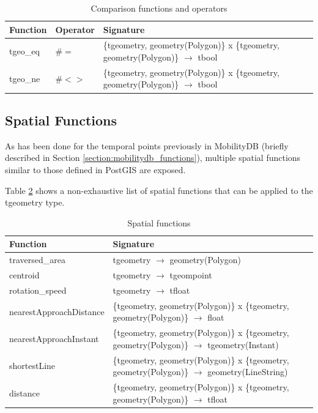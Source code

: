 \begin{table}[h!]
    \centering
    \begin{tabularx}{\textwidth}{|l|l|X|}
    \hline
    \textbf{Function}   & \textbf{Operator} & \textbf{Signature} \\
    \hline
    tgeo\_eq    & $\#=$   & \{tgeometry, geometry(Polygon)\} x \{tgeometry, geometry(Polygon)\} $\rightarrow$ tbool \\
    \hline
    tgeo\_ne    & $\#<>$  & \{tgeometry, geometry(Polygon)\} x \{tgeometry, geometry(Polygon)\} $\rightarrow$ tbool \\
    \hline
    \end{tabularx}
    \caption{Comparison functions and operators}
    \label{table:comparison_funcs}
\end{table}

\subsection{Spatial Functions}
\label{section:spatial_funcs}

As has been done for the temporal points previously in MobilityDB (briefly described in Section \ref{section:mobilitydb_functions}), multiple spatial functions similar to those defined in PostGIS are exposed. 

Table \ref{table:spatial_funcs} shows a non-exhaustive list of spatial functions that can be applied to the tgeometry type.

\begin{table}[h!]
    \centering
    \begin{tabularx}{\textwidth}{|l|X|}
    \hline
    \textbf{Function}   & \textbf{Signature} \\ 
    \hline
    traversed\_area      & tgeometry $\rightarrow$ geometry(Polygon)\\
    \hline
    centroid            & tgeometry $\rightarrow$ tgeompoint\\
    \hline
    rotation\_speed      & tgeometry $\rightarrow$ tfloat \\
    \hline
    nearestApproachDistance & \{tgeometry, geometry(Polygon)\} x \{tgeometry, geometry(Polygon)\} $\rightarrow$ float \\
    \hline
    nearestApproachInstant  & \{tgeometry, geometry(Polygon)\} x \{tgeometry, geometry(Polygon)\} $\rightarrow$ tgeometry(Instant) \\
    \hline
    shortestLine         & \{tgeometry, geometry(Polygon)\} x \{tgeometry, geometry(Polygon)\} $\rightarrow$ geometry(LineString) \\
    \hline
    distance         & \{tgeometry, geometry(Polygon)\} x \{tgeometry, geometry(Polygon)\} $\rightarrow$ tfloat \\
    \hline
    \end{tabularx}
    \caption{Spatial functions}
    \label{table:spatial_funcs}
\end{table}

